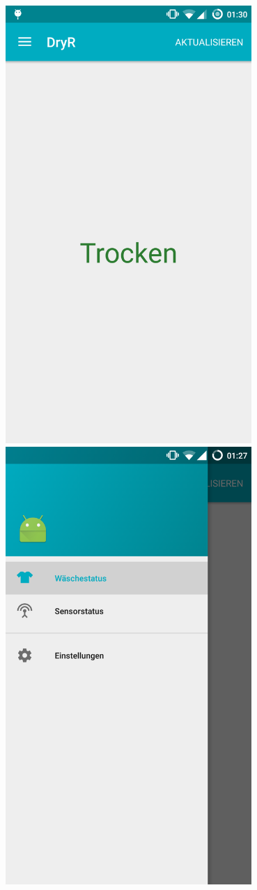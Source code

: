 \begin{description}
\begin{description}
\includegraphics[width=0.7\textwidth]{laundry_status_dry.png}
\includegraphics[width=0.7\textwidth]{nav_drawer.png}

\end{description}
\end{description}
